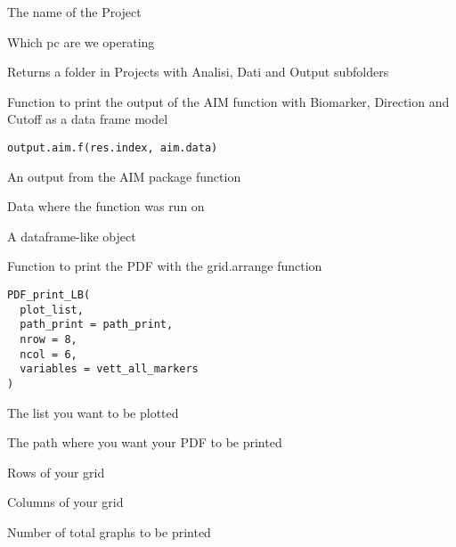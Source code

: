 \documentclass[a4paper]{book}
\begin{document}
%
\begin{Arguments}
\begin{ldescription}
\item[\code{name\_project}] The name of the Project

\item[\code{pc}] Which pc are we operating
\end{ldescription}
\end{Arguments}
%
\begin{Value}
Returns a folder in Projects with Analisi, Dati and Output subfolders
\end{Value}
%
\begin{Description}
Function to print the output of the AIM function with Biomarker, Direction and Cutoff as a data frame model
\end{Description}
%
\begin{Usage}
\begin{verbatim}
output.aim.f(res.index, aim.data)
\end{verbatim}
\end{Usage}
%
\begin{Arguments}
\begin{ldescription}
\item[\code{res.index}] An output from the AIM package function

\item[\code{aim.data}] Data where the function was run on
\end{ldescription}
\end{Arguments}
%
\begin{Value}
A dataframe-like object
\end{Value}
%
\begin{Description}
Function to print the PDF with the grid.arrange function
\end{Description}
%
\begin{Usage}
\begin{verbatim}
PDF_print_LB(
  plot_list,
  path_print = path_print,
  nrow = 8,
  ncol = 6,
  variables = vett_all_markers
)
\end{verbatim}
\end{Usage}
%
\begin{Arguments}
\begin{ldescription}
\item[\code{plot\_list}] The list you want to be plotted

\item[\code{path\_print}] The path where you want your PDF to be printed

\item[\code{nrow}] Rows of your grid

\item[\code{ncol}] Columns of your grid

\item[\code{variables}] Number of total graphs to be printed
\end{ldescription}
\end{Arguments}
\end{document}
